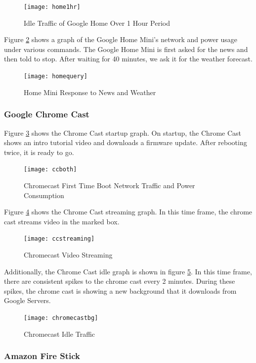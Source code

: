 \begin{figure}[H]
  \centering
    \texttt{[image: home1hr]}
  \caption{Idle Traffic of Google Home Over 1 Hour Period}
  \label{fig:home}
\end{figure}

Figure \ref{fig:homequery} shows a graph of the Google Home Mini's network and power usage under various commands. The Google Home Mini is first asked for the news and then told to stop. After waiting for 40 minutes, we ask it for the weather forecast.

\begin{figure}[H]
  \centering
    \texttt{[image: homequery]}
  \caption{Home Mini Response to News and Weather}
  \label{fig:homequery}
\end{figure}

\subsubsection{Google Chrome Cast}
Figure \ref{fig:ccboth} shows the Chrome Cast startup graph. On startup, the Chrome Cast shows an intro tutorial video and downloads a firmware update. After rebooting twice, it is ready to go.

\begin{figure}[H]
  \centering
  \texttt{[image: ccboth]}
  \caption{Chromecast First Time Boot Network Traffic and Power Consumption}
  \label{fig:ccboth}
\end{figure}

Figure \ref{fig:ccstream} shows the Chrome Cast streaming graph. In this time frame, the chrome cast streams video in the marked box.

\begin{figure}[H]
  \centering
  \texttt{[image: ccstreaming]}
  \caption{Chromecast Video Streaming}
  \label{fig:ccstream}
\end{figure}

Additionally, the Chrome Cast idle graph is shown in figure \ref{fig:ccbg}. In this time frame, there are consistent spikes to the chrome cast every 2 minutes. During these spikes, the chrome cast is showing a new background that it downloads from Google Servers.

\begin{figure}[H]
  \centering
  \texttt{[image: chromecastbg]}
  \caption{Chromecast Idle Traffic}
  \label{fig:ccbg}
\end{figure}

\subsubsection{Amazon Fire Stick}

